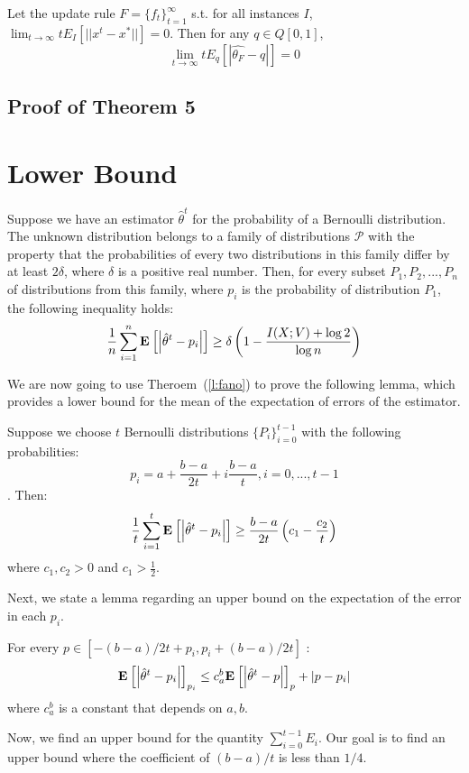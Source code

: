 \begin{corollary}
Let the update rule $F=\{f_t\}_{t=1}^\infty$ s.t. for all instances $I$, $\lim_{t \rightarrow \infty} t E_I[||x^t -x^*||]=0$.
Then for any  $q \in Q[0,1]$, $$\lim_{t \rightarrow \infty}tE_q[|\hat{\theta_F} -q|]=0$$
\end{corollary}

\subsection{Proof of Theorem 5}
\section{Lower Bound}


\begin{lemma}\label{l:fano}
Suppose we have an estimator $\hat{\theta}^t$ for the probability of a Bernoulli distribution. 
The unknown distribution belongs to a family of distributions $\mathcal{P}$ with the property that the probabilities of every two distributions in this family differ by at least $2\delta$, where $\delta$ is a positive real number.
Then, for every subset ${P_1, P_2, ..., P_n}$ of distributions from this family, where $p_i$ is the probability of distribution $P_1$, the following inequality holds:
$$\frac{1}{n} \sum_{i=1}^n \Exp{\lp|\hat{\theta}^t-p_i\rp|} \geq \delta \lp(1-\frac{I(X;V)+\log 2}{\log n}\rp)$$
\end{lemma}

We are now going to use Theroem~(\ref{l:fano}) to prove the following lemma, which provides a lower bound for the mean of the expectation of errors of the estimator.
\begin{lemma}\label{l:fano_application}
Suppose we choose $t$ Bernoulli distributions $\{P_i\}_{i=0}^{t-1}$ with the following probabilities: $$p_i = a+\frac{b-a}{2t} + i \frac{b-a}{t} , i=0, ..., t-1$$. Then:
$$\frac{1}{t} \sum_{i=1}^t \Exp{\lp|\hat{\theta}^t-p_i\rp|} \geq \frac{b-a}{2t} \lp(c_1 - \frac{c_2}{t}\rp)$$
where $c_1, c_2 >0$ and $c_1 > \frac{1}{2}$.
\end{lemma}

Next, we state a lemma regarding an upper bound on the expectation of the error in each $p_i$.
\begin{lemma}\label{l:cauchy_schwarz}
For every $p\in [-(b-a)/{2t} + p_i , p_i + (b-a)/{2t}]$ :
$$\Exp{\lp|\hat{\theta}^t-p_i\rp|}_{p_i} \leq c_a^b\Exp{\lp|\hat{\theta}^t-p\rp|}_p + \lp|p - p_i\rp|
$$
where $c_a^b$ is a constant that depends on $a,b$.
 
\end{lemma}
Now, we find an upper bound for the quantity $\sum_{i=0}^{t-1} E_i$.
Our goal is to find an upper bound where the coefficient of $(b-a)/t$ is less than $1/4$.

